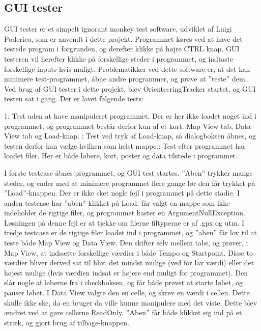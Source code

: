 \subsection{GUI tester}
GUI tester er et simpelt ignorant monkey test software, udviklet af Luigi Poderico, som er anvendt i dette projekt. Programmet køres ved at have det testede program i forgrunden, og derefter klikke på højre CTRL knap. GUI testeren vil herefter klikke på forskellige steder i programmet, og indtaste forskellige inputs hvis muligt. Problematikker ved dette software er, at det kan minimere test-programmet, åbne andre programmer, og prøve at ”teste” dem. \citep{GUItester} \newline
Ved brug af GUI tester i dette projekt, blev OrienteeringTracker startet, og GUI testen sat i gang. Der er lavet følgende tests:

1: Test uden at have manipuleret programmet. Der er her ikke loadet noget ind i programmet, og programmet består derfor kun af et kort, Map View tab, Data View tab og Load-knap. : Test ved tryk af Load-knap, så dialogboksen åbnes, og testen derfor kan vælge hvilken som helst mappe.: Test efter programmet har loadet filer. Her er både løbere, kort, poster og data tilstede i programmet.

I første testcase åbnes programmet, og GUI test startes. ”Aben” trykker mange steder, og ender med at minimere programmet flere gange før den får trykket på ”Load”-knappen. Der er ikke sket nogle fejl i programmet på dette stadie.\newline
I anden testcase har ”aben” klikket på Load, får valgt en mappe som ikke indeholder de rigtige filer, og programmet kaster en ArgumentNullException. Løsningen på denne fejl er at tjekke om filerne filtyperne er af .gpx og utm. \newline
I tredje testcase er de rigtige filer loadet ind i programmet, og ”aben” får lov til at teste både Map View og Data View. Den skifter selv mellem tabs, og prøver, i Map View, at indsætte forskellige værdier i både Tempo og Startpoint. Disse to værdier bliver derved sat til hhv. det mindst mulige (ved for lav værdi) eller det højest mulige (hvis værdien indsat er højere end muligt for programmet). Den slår nogle af løberne fra i checkboksen, og får både prøvet at starte løbet, og pauser løbet. I Data View valgte den en celle, og skrev en værdi i cellen. Dette skulle ikke ske, da en bruger da ville kunne manipulere med det viste. Dette blev ændret ved at gøre cellerne ReadOnly. ”Aben” får både klikket sig ind på et stræk, og gjort brug af tilbage-knappen.

